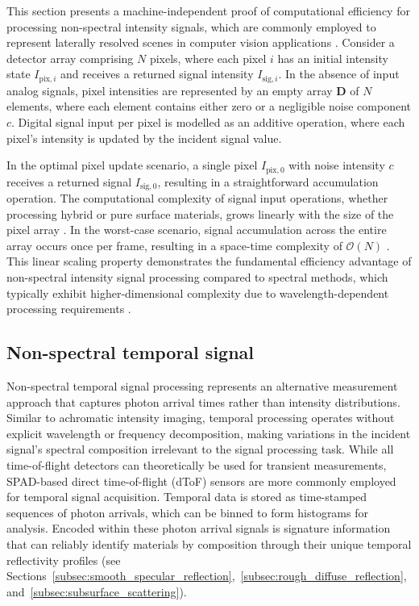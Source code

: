 \documentclass[12pt,a4paper,oneside]{report}
\begin{document}
This section presents a machine-independent proof of computational efficiency for processing non-spectral intensity signals, which are commonly employed to represent laterally resolved scenes in computer vision applications \cite{schwartz2013,sharan2013}. Consider a detector array comprising $N$ pixels, where each pixel $i$ has an initial intensity state $I_{\text{pix},i}$ and receives a returned signal intensity $I_{\text{sig},i}$. In the absence of input analog signals, pixel intensities are represented by an empty array $\mathbf{D}$ of $N$ elements, where each element contains either zero or a negligible noise component $c$. Digital signal input per pixel is modelled as an additive operation, where each pixel's intensity is updated by the incident signal value.

In the optimal pixel update scenario, a single pixel $I_{\text{pix},0}$ with noise intensity $c$ receives a returned signal $I_{\text{sig},0}$, resulting in a straightforward accumulation operation. The computational complexity of signal input operations, whether processing hybrid or pure surface materials, grows linearly with the size of the pixel array \cite{knuth1976}. In the worst-case scenario, signal accumulation across the entire array occurs once per frame, resulting in a space-time complexity of $\mathcal{O}(N)$ \cite{knuth1976}. This linear scaling property demonstrates the fundamental efficiency advantage of non-spectral intensity signal processing compared to spectral methods, which typically exhibit higher-dimensional complexity due to wavelength-dependent processing requirements \cite{heinz2001,schott2007}.


\subsection{Non-spectral temporal signal}
\label{subsec:non-spectral_temporal_signal}

Non-spectral temporal signal processing represents an alternative measurement approach that captures photon arrival times rather than intensity distributions. Similar to achromatic intensity imaging, temporal processing operates without explicit wavelength or frequency decomposition, making variations in the incident signal's spectral composition irrelevant to the signal processing task. While all time-of-flight detectors can theoretically be used for transient measurements, SPAD-based direct time-of-flight (dToF) sensors are more commonly employed for temporal signal acquisition. Temporal data is stored as time-stamped sequences of photon arrivals, which can be binned to form histograms for analysis. Encoded within these photon arrival signals is signature information that can reliably identify materials by composition through their unique temporal reflectivity profiles (see Sections~\ref{subsec:smooth_specular_reflection},~\ref{subsec:rough_diffuse_reflection}, and~\ref{subsec:subsurface_scattering}).
\end{document}
